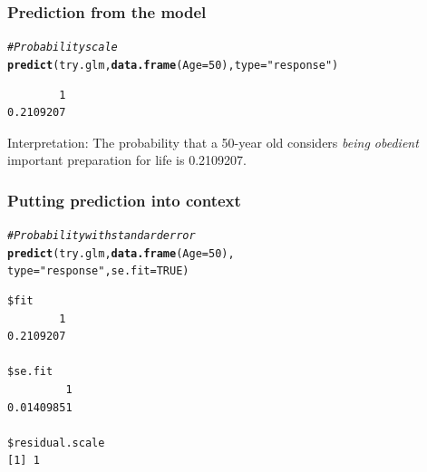 \documentclass{beamer}\usepackage[]{graphicx}\usepackage[]{color}
\makeatletter
\newcommand{\hlnum}[1]{\textcolor[rgb]{0.686,0.059,0.569}{#1}}%
\newcommand{\hlstr}[1]{\textcolor[rgb]{0.192,0.494,0.8}{#1}}%
\newcommand{\hlcom}[1]{\textcolor[rgb]{0.678,0.584,0.686}{\textit{#1}}}%
\newcommand{\hlstd}[1]{\textcolor[rgb]{0.345,0.345,0.345}{#1}}%
\newcommand{\hlkwc}[1]{\textcolor[rgb]{0.333,0.667,0.333}{#1}}%
\newcommand{\hlkwd}[1]{\textcolor[rgb]{0.737,0.353,0.396}{\textbf{#1}}}%
\newenvironment{kframe}{%
 \def\at@end@of@kframe{}%
 \ifinner\ifhmode%
  \def\at@end@of@kframe{\end{minipage}}%
  \begin{minipage}{\columnwidth}%
 \fi\fi%
 \def\FrameCommand##1{\hskip\@totalleftmargin \hskip-\fboxsep
 \colorbox{shadecolor}{##1}\hskip-\fboxsep
     \hskip-\linewidth \hskip-\@totalleftmargin \hskip\columnwidth}%
 \MakeFramed {\advance\hsize-\width
   \@totalleftmargin\z@ \linewidth\hsize
   \@setminipage}}%
 {\par\unskip\endMakeFramed%
 \at@end@of@kframe}
\newenvironment{knitrout}{}{} %
\makeatother
\begin{document}
\begin{frame}[fragile]
\frametitle{Prediction from the model}
\begin{knitrout}
\color{fgcolor}\begin{kframe}
\begin{alltt}
\hlcom{#Probability scale}
\hlkwd{predict}\hlstd{(try.glm,} \hlkwd{data.frame}\hlstd{(}\hlkwc{Age} \hlstd{=} \hlnum{50}\hlstd{),} \hlkwc{type} \hlstd{=} \hlstr{"response"}\hlstd{)}
\end{alltt}
\begin{verbatim}
        1 
0.2109207 
\end{verbatim}
\end{kframe}
\end{knitrout}
Interpretation: The probability that a 50-year old considers {\em being obedient} important preparation for life is 0.2109207.
\end{frame}

\begin{frame}[fragile]
\frametitle{Putting prediction into context}
\begin{knitrout}
\color{fgcolor}\begin{kframe}
\begin{alltt}
\hlcom{#Probability with standard error}
\hlkwd{predict}\hlstd{(try.glm,} \hlkwd{data.frame}\hlstd{(}\hlkwc{Age} \hlstd{=} \hlnum{50}\hlstd{),}
\hlkwc{type} \hlstd{=} \hlstr{"response"}\hlstd{,} \hlkwc{se.fit} \hlstd{=} \hlnum{TRUE}\hlstd{)}
\end{alltt}
\begin{verbatim}
$fit
        1 
0.2109207 

$se.fit
         1 
0.01409851 

$residual.scale
[1] 1
\end{verbatim}
\end{kframe}
\end{knitrout}
\end{frame}
\end{document}
